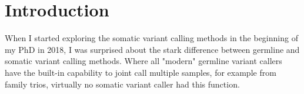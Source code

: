 \section{Introduction}
\label{variantcalling-sec:intro}

When I started exploring the somatic variant calling methods in the beginning of my PhD in 2018, I was surprised about the stark difference between germline and somatic variant calling methods. Where all "modern" germline variant callers have the built-in capability to joint call multiple samples, for example from family trios, virtually no somatic variant caller had this function.